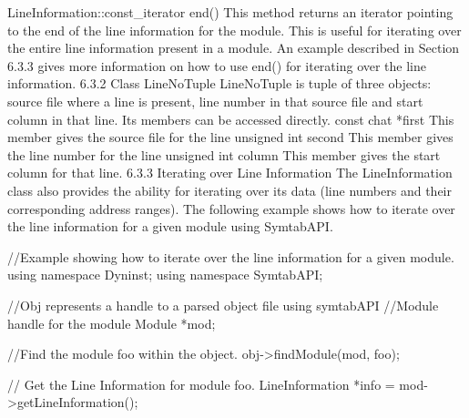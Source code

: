 LineInformation::const_iterator end()
This method returns an iterator pointing to the end of the line information for the module.
This is useful for iterating over the entire line information present in a module. An example described in Section 6.3.3 gives more information on how to use end() for iterating over the line information.
6.3.2 Class LineNoTuple
LineNoTuple is tuple of three objects: source file where a line is present, line number in that source file and start column in that line. Its members can be accessed directly. 
const chat *first
This member gives the source file for the line
unsigned int second
This member gives the line number for the line
unsigned int column
This member gives the start column for that line.
6.3.3 Iterating over Line Information
The LineInformation class also provides the ability for iterating over its data (line numbers and their corresponding address ranges). The following example shows how to iterate over the line information for a given module using SymtabAPI.

//Example showing how to iterate over the line information for a given module.
using namespace Dyninst;
using namespace SymtabAPI;

//Obj represents a handle to a parsed object file using symtabAPI
//Module handle for the module
Module *mod;

//Find the module foo within the object.
obj->findModule(mod, foo);

// Get the Line Information for module foo.
LineInformation *info = mod->getLineInformation();

